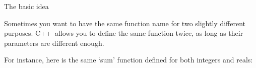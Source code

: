 
 {The basic idea}

Sometimes you want to have the same function name for two slightly
different purposes. C++~allows you to define the same function twice,
as long as their parameters are different enough.

For instance, here is the same `sum' function defined for both
integers and reals:
%

